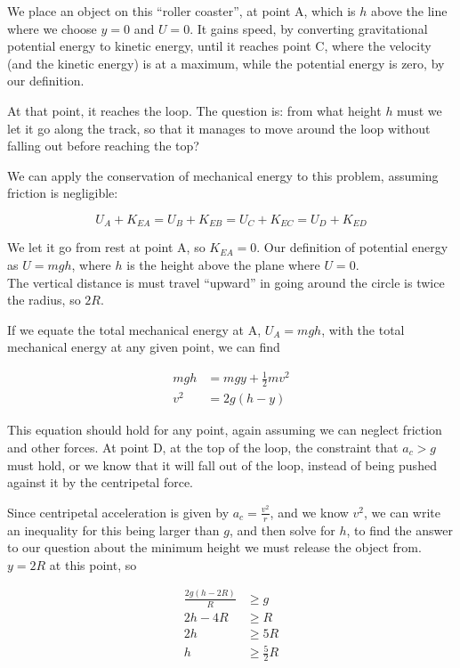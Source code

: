 We place an object on this ``roller coaster'', at point A, which is $h$ above the line where we choose $y = 0$ and $U = 0$. It gains speed, by converting gravitational potential energy to kinetic energy, until it reaches point C, where the velocity (and the kinetic energy) is at a maximum, while the potential energy is zero, by our definition.

At that point, it reaches the loop. The question is: from what height $h$ must we let it go along the track, so that it manages to move around the loop without falling out before reaching the top?

We can apply the conservation of mechanical energy to this problem, assuming friction is negligible:

\begin{equation}
U_A + K_{EA} = U_B + K_{EB} = U_C + K_{EC} = U_D + K_{ED}
\end{equation}

We let it go from rest at point A, so $K_{EA} = 0$. Our definition of potential energy as $U = m g h$, where $h$ is the height above the plane where $U = 0$.\\
The vertical distance is must travel ``upward'' in going around the circle is twice the radius, so $2R$.

If we equate the total mechanical energy at A, $U_A = m g h$, with the total mechanical energy at any given point, we can find

\begin{align}
m g h &= m g y + \frac{1}{2} m v^2\\
v^2   &= 2g (h - y)
\end{align}

This equation should hold for any point, again assuming we can neglect friction and other forces. At point D, at the top of the loop, the constraint that $a_c > g$ must hold, or we know that it will fall out of the loop, instead of being pushed against it by the centripetal force.

Since centripetal acceleration is given by $\displaystyle a_c = \frac{v^2}{r}$, and we know $v^2$, we can write an inequality for this being larger than $g$, and then solve for $h$, to find the answer to our question about the minimum height we must release the object from.\\
$y = 2 R$ at this point, so

\begin{align}
\frac{2g (h - 2R)}{R} &\ge g\\
2 h - 4R &\ge R\\
2 h &\ge 5R\\
h &\ge \frac{5}{2} R
\end{align}

